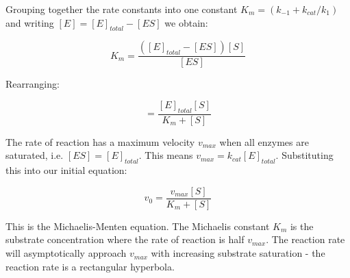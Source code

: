\documentclass[11pt]{article} %
\begin{document}
Grouping together the rate constants into one constant $K_{m} = (k_{-1} + k_{cat}/k_{1})$ and writing $[E] = [E]_{total} - [ES]$ we obtain:

\begin{equation}
K_{m} = \frac{([E]_{total} - [ES])[S]}{[ES]}
\end{equation}

Rearranging:

\begin{equation}
[ES] = \frac{[E]_{total}[S]}{K_{m} + [S]}
\end{equation}

The rate of reaction has a maximum velocity $v_{max}$ when all enzymes are saturated, i.e. $[ES] = [E]_{total}$. This means $v_{max} = k_{cat}[E]_{total}$. Substituting this into our initial equation:

\begin{equation}
v_{0} = \frac{v_{max}[S]}{K_{m} + [S]}
\end{equation}

This is the Michaelis-Menten equation. The Michaelis constant $K_{m}$ is the substrate concentration where the rate of reaction is half $v_{max}$. The reaction rate will asymptotically approach $v_{max}$ with increasing substrate saturation - the reaction rate is a rectangular hyperbola.



\end{document}

